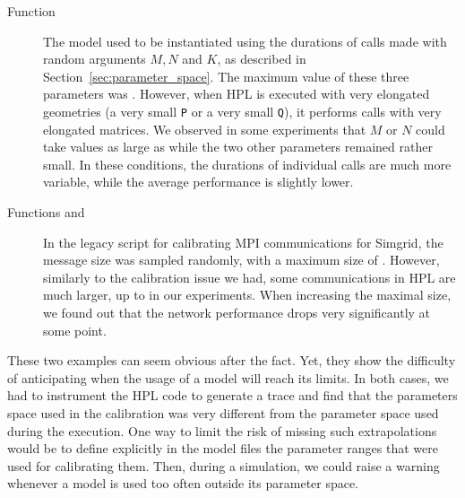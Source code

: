         \begin{description}
            \item[Function \dgemm] The model used to be instantiated using the durations of \dgemm calls made with
                random arguments \(M,N\) and \(K\), as described in Section~\ref{sec:parameter_space}. The maximum value
                of these three parameters was . However, when HPL is executed with very elongated
                geometries (\eg a very small \texttt{P} or a very small \texttt{Q}), it performs \dgemm calls with very
                elongated matrices. We observed in some experiments that \(M\) or \(N\) could take values as large as
                 while the two other parameters remained rather small. In these conditions, the durations of
                individual \dgemm calls are much more variable, while the average performance is slightly lower.
            \item[Functions \recv and \send] In the legacy script for calibrating MPI communications for Simgrid, the
                message size was sampled randomly, with a maximum size of . However, similarly to the
                \dgemm calibration issue we had, some communications in HPL are much larger, up to 
                in our experiments. When increasing the maximal size, we found out that the network performance drops
                very significantly at some point.
        \end{description}

        These two examples can seem obvious after the fact. Yet, they show the difficulty of anticipating when the usage
        of a model will reach its limits. In both cases, we had to instrument the HPL code to generate a trace and
        find that the parameters space used in the calibration was very different from the parameter space used during
        the execution. One way to limit the risk of missing such extrapolations would be to define explicitly in the
        model files the parameter ranges that were used for calibrating them. Then, during a simulation, we could raise
        a warning whenever a model is used too often outside its parameter space.


